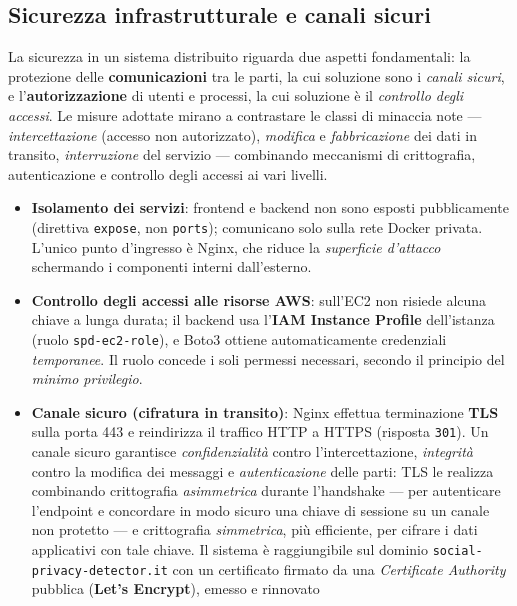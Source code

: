 \documentclass[11pt,a4paper]{article}
\begin{document}
\subsection{Sicurezza infrastrutturale e canali sicuri}
La sicurezza in un sistema distribuito riguarda due aspetti fondamentali: la
protezione delle \textbf{comunicazioni} tra le parti, la cui soluzione sono i
\emph{canali sicuri}, e l'\textbf{autorizzazione} di utenti e processi, la cui soluzione
è il \emph{controllo degli accessi}. Le misure adottate mirano a contrastare le classi
di minaccia note --- \emph{intercettazione} (accesso non autorizzato), \emph{modifica}
e \emph{fabbricazione} dei dati in transito, \emph{interruzione} del servizio ---
combinando meccanismi di crittografia, autenticazione e controllo degli accessi ai vari
livelli.
\begin{itemize}[nosep]
  \item \textbf{Isolamento dei servizi}: frontend e backend non sono esposti
        pubblicamente (direttiva \texttt{expose}, non \texttt{ports}); comunicano solo
        sulla rete Docker privata. L'unico punto d'ingresso è Nginx, che riduce la
        \emph{superficie d'attacco} schermando i componenti interni dall'esterno.
  \item \textbf{Controllo degli accessi alle risorse AWS}: sull'EC2 non risiede alcuna
        chiave a lunga durata; il backend usa l'\textbf{IAM Instance Profile}
        dell'istanza (ruolo \texttt{spd-ec2-role}), e Boto3 ottiene automaticamente
        credenziali \emph{temporanee}. Il ruolo concede i soli permessi necessari,
        secondo il principio del \emph{minimo privilegio}.
  \item \textbf{Canale sicuro (cifratura in transito)}: Nginx effettua terminazione
        \textbf{TLS} sulla porta 443 e reindirizza il traffico HTTP a HTTPS (risposta
        \texttt{301}). Un canale sicuro garantisce \emph{confidenzialità} contro
        l'intercettazione, \emph{integrità} contro la modifica dei messaggi e
        \emph{autenticazione} delle parti: TLS le realizza combinando crittografia
        \emph{asimmetrica} durante l'handshake --- per autenticare l'endpoint e
        concordare in modo sicuro una chiave di sessione su un canale non protetto ---
        e crittografia \emph{simmetrica}, più efficiente, per cifrare i dati
        applicativi con tale chiave. Il sistema è raggiungibile sul dominio
        \texttt{social-privacy-detector.it} con un certificato firmato da una
        \emph{Certificate Authority} pubblica (\textbf{Let's Encrypt}), emesso e rinnovato

\end{itemize}
\end{document}
